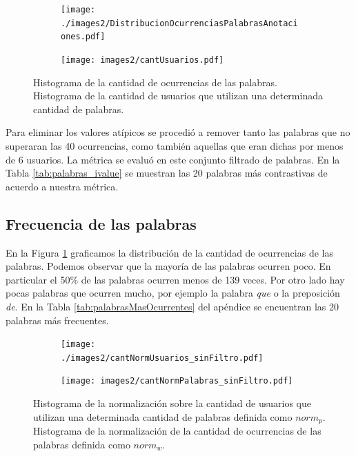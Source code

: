 \begin{figure}[!ht]\centering
  \begin{subfigure}[t]{0.49\textwidth}
    \texttt{[image: ./images2/DistribucionOcurrenciasPalabrasAnotaciones.pdf]}
    \caption{}
    \label{fig:cantPalabrasAnotaciones} 
   \end{subfigure}
   \begin{subfigure}[t]{0.49\textwidth}
    \texttt{[image: images2/cantUsuarios.pdf]} 
    \caption{}
    \label{fig:cantUsuarios} 
   \end{subfigure}
   \caption{ Histograma de la cantidad de ocurrencias de las palabras.  Histograma de la cantidad de usuarios que utilizan una determinada cantidad de palabras.} 
   \label{fig:cantPalabrasSinNorm} 
\end{figure}

Para eliminar los valores atípicos se procedió a remover tanto las palabras que no superaran las 40 ocurrencias, como también aquellas que eran dichas por menos de 6 usuarios. La métrica se evaluó en este conjunto filtrado de palabras. En la Tabla \ref{tab:palabras_ivalue} se muestran las 20 palabras más contrastivas de acuerdo a nuestra métrica.

\subsection{Frecuencia de las palabras}
\label{sub: frecuenciaPalabras}
En la Figura \ref{fig:cantPalabrasAnotaciones} graficamos la distribución de la cantidad de ocurrencias de las palabras. Podemos observar que la mayoría de las palabras ocurren poco. En particular el 50\% de las palabras ocurren menos de 139 veces. Por otro lado hay pocas palabras que ocurren mucho, por ejemplo la palabra \textit{que} o la preposición \textit{de}. En la Tabla \ref{tab:palabrasMasOcurrentes} del apéndice se encuentran las 20 palabras más frecuentes.


\begin{figure}[!ht]\centering
  \begin{subfigure}[t]{0.49\textwidth}
    \texttt{[image: ./images2/cantNormUsuarios\_sinFiltro.pdf]}
    \caption{} 
    \label{fig:cantNormUsuarios} 
   \end{subfigure}
   \begin{subfigure}[t]{0.49\textwidth}
    \texttt{[image: images2/cantNormPalabras\_sinFiltro.pdf]}
    \caption{} 
    \label{fig:cantNormPalabras} 
   \end{subfigure}
   \caption{ Histograma de la normalización sobre la cantidad de usuarios que utilizan una determinada cantidad de palabras definida como $norm_p$.  Histograma de la normalización de la cantidad de ocurrencias de las palabras definida como $norm_w$.}
   \label{fig:cantNormFig}
\end{figure}



